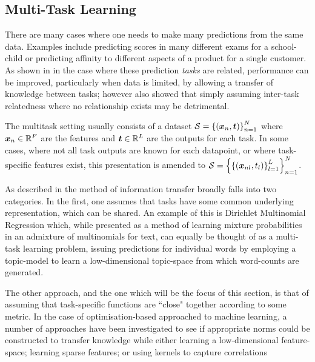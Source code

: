 

\subsection{Multi-Task Learning}

There are many cases where one needs to make many predictions from the same data. Examples include predicting scores in many different exams for a school-child\cite{Bonilla2008}\cite{Evgeniou2005} or predicting affinity to different aspects of a product for a single customer\cite{Allenby1999}. As shown in \cite{Caruana1997} in the case where these prediction \emph{tasks} are related, performance can be improved, particularly when data is limited, by allowing a transfer of knowledge between tasks; however \cite{Caruana1997} also showed that simply assuming inter-task relatedness where no relationship exists may be detrimental.

The multitask setting usually consists of a dataset $\mathcal{S} = \left\{\left(\bm x_n, \bm t\right)\right\}_{n=1}^N$ where $\bm x_n \in { \mathbb{R}^{F} }$ are the features and $\bm t \in { \mathbb{R}^{L} }$ are the outputs for each task. In some cases, where not all task outputs are known for each datapoint, or where task-specific features exist, this presentation is amended to $\mathcal{S} = \left\{\left\{\left(\bm x_{nl}, t_l\right)\right\}_{l=1}^L\right\}_{n=1}^N$. 

As described in\cite{Argyriou2005} the method of information transfer broadly falls into two categories. In the first, one assumes that tasks have some common underlying representation, which can be shared\cite{Caruana1997}. An example of this is Dirichlet Multinomial Regression\cite{Mimno2008} which, while presented as a method of learning mixture probabilities in an admixture of multinomials for text, can equally be thought of as a multi-task learning problem, issuing predictions for individual words by employing a topic-model to learn a low-dimensional topic-space from which word-counts are generated. 

The other approach, and the one which will be the focus of this section, is that of assuming that task-specific functions are ``close" together according to some metric. In the case of optimisation-based approached to machine learning, a number of approaches have been investigated to see if appropriate norms could be constructed to transfer knowledge while either learning a low-dimensional feature-space\cite{argyriou2007spectral}; learning sparse features\cite{Argyriou2005}; or using kernels to capture correlations\cite{Evgeniou2005}

